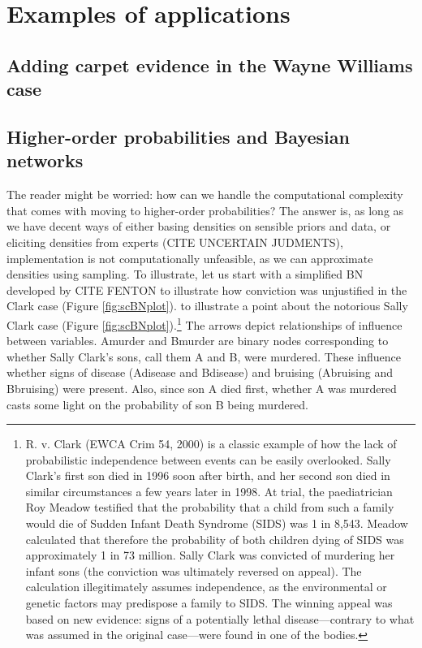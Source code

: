 \documentclass[
  10pt,
  dvipsnames,enabledeprecatedfontcommands]{scrartcl}
\begin{document}
\hypertarget{examples-of-applications}{%
\section{Examples of applications}\label{examples-of-applications}}

\hypertarget{adding-carpet-evidence-in-the-wayne-williams-case}{%
\subsection{Adding carpet evidence in the Wayne Williams
case}\label{adding-carpet-evidence-in-the-wayne-williams-case}}

\hypertarget{higher-order-probabilities-and-bayesian-networks}{%
\subsection{Higher-order probabilities and Bayesian
networks}\label{higher-order-probabilities-and-bayesian-networks}}

The reader might be worried: how can we handle the computational
complexity that comes with moving to higher-order probabilities? The
answer is, as long as we have decent ways of either basing densities on
sensible priors and data, or eliciting densities from experts (CITE
UNCERTAIN JUDMENTS), implementation is not computationally unfeasible,
as we can approximate densities using sampling. To illustrate, let us
start with a simplified BN developed by CITE FENTON to illustrate how
conviction was unjustified in the Clark case (Figure
\ref{fig:scBNplot}). to illustrate a point about the notorious Sally
Clark case (Figure \ref{fig:scBNplot}).\footnote{R. v. Clark (EWCA Crim
  54, 2000) is a classic example of how the lack of probabilistic
  independence between events can be easily overlooked. Sally Clark's
  first son died in 1996 soon after birth, and her second son died in
  similar circumstances a few years later in 1998. At trial, the
  paediatrician Roy Meadow testified that the probability that a child
  from such a family would die of Sudden Infant Death Syndrome (SIDS)
  was 1 in 8,543. Meadow calculated that therefore the probability of
  both children dying of SIDS was approximately 1 in 73 million. Sally
  Clark was convicted of murdering her infant sons (the conviction was
  ultimately reversed on appeal). The calculation illegitimately assumes
  independence, as the environmental or genetic factors may predispose a
  family to SIDS. The winning appeal was based on new evidence: signs of
  a potentially lethal disease---contrary to what was assumed in the
  original case---were found in one of the bodies.} The arrows depict
relationships of influence between variables. \textsf{Amurder} and
\textsf{Bmurder} are binary nodes corresponding to whether Sally Clark's
sons, call them A and B, were murdered. These influence whether signs of
disease (\textsf{Adisease} and \textsf{Bdisease}) and bruising
(\textsf{Abruising} and \textsf{Bbruising}) were present. Also, since
son A died first, whether A was murdered casts some light on the
probability of son B being murdered.
\end{document}
